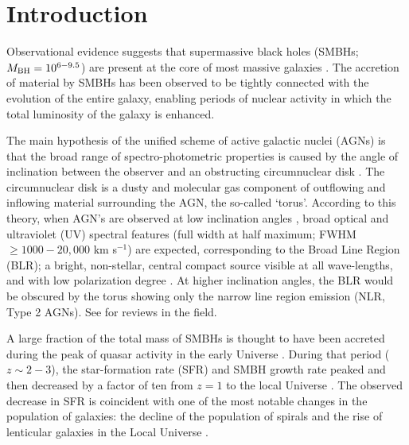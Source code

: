 \documentclass[modern]{CORE-AAS/aastex631}
\begin{document}
{\section{Introduction} \label{sec:intro}
Observational evidence suggests that supermassive black holes (SMBHs; $M_{\rm BH}=10^{6-9.5}$) are present at the core of most massive galaxies \citep{kormendy+2013araa51_511}. The accretion of material by SMBHs has been observed to be tightly connected with the evolution of the entire galaxy, enabling periods of nuclear activity in which the total luminosity of the galaxy is enhanced. 

The main hypothesis of the unified scheme of active galactic nuclei (AGNs) is that the broad range of spectro-photometric properties is caused by the angle of inclination between the observer and an obstructing circumnuclear disk \citep{antonucci1993araa31_473, urry+1995pasp107_803}. The circumnuclear disk is a dusty and molecular gas component of outflowing and inflowing material surrounding the AGN, the so-called `torus'. According to this theory, when AGN's are observed at low inclination angles \citep[$i<45$--$60^{\circ}$, where $i=0^{\circ}$ would be face-on,][]{marin2014mnras441_551}, broad optical and ultraviolet (UV) spectral features (full width at half maximum; FWHM $\geq 1000-20,000$ km s$^{-1}$) are expected, corresponding to the Broad Line Region (BLR); a bright, non-stellar, central compact source visible at all wave-lengths, and with low polarization degree \citep[Type 1 AGNs,][]{netzer2015araa53_365}. At higher inclination angles, the BLR would be obscured by the torus showing only the narrow line region emission (NLR, Type 2 AGNs). See \citet{peterson2006incollection_77, netzer2015araa53_365, ramosalmeida+2017nat1_679} for reviews in the field.


A large fraction of the total mass of SMBHs is thought to have been accreted during the peak of quasar activity in the early Universe \citep[$z=2-3$,][]{boyle+1998mnras293_49, delvecchio+2014mnras439_2736, madau+2014araa52_415}. During that period ($z\sim2-3$), the star-formation rate (SFR) and SMBH growth rate peaked and then decreased by a factor of ten from $z=1$ to the local Universe \citep{shankar+2009apj690_20}. The observed decrease in SFR is coincident with one of the most notable changes in the population of galaxies: the decline of the population of spirals and the rise of lenticular galaxies in the Local Universe \citep{dressler+1997apj490_577}.

}
\end{document}
